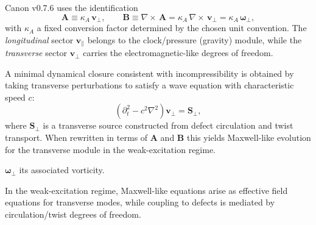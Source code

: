 \documentclass[10pt]{article}
\newcommand{\swirlarrow}{ \mathchoice{\mkern-2mu\scriptstyle\boldsymbol{\circlearrowleft}}{\mkern-2mu\scriptscriptstyle\boldsymbol{\circlearrowleft}}}
\newcommand{\vswirl}{\mathbf{v}_{\!\boldsymbol{\circlearrowleft}}}
\newcommand{\rhoF}{\rho_{\!f}}
\newcommand{\rhoE}{\rho_{\!E}}                           %
\newcommand{\rhoM}{\rho_{\!m}}     %
\newcommand{\rc}{r_c}                                    %
\newcommand{\curlop}{\nabla\times}
\begin{document}
    Canon v0.7.6 uses the identification
    \begin{equation}
        \mathbf{A} \equiv \kappa_A\,\mathbf{v}_{\perp},
        \qquad
        \mathbf{B} \equiv \curlop\,\mathbf{A}=\kappa_A\,\curlop\,\mathbf{v}_{\perp}
        =\kappa_A\,\boldsymbol{\omega}_{\perp},
        \label{eq:AB_from_vperp}
    \end{equation}
    with $\kappa_A$ a fixed conversion factor determined by the chosen unit convention.
    The \emph{longitudinal} sector $\mathbf{v}_{\parallel}$ belongs to the clock/pressure
    (gravity) module, while the \emph{transverse} sector $\mathbf{v}_{\perp}$ carries
    the electromagnetic-like degrees of freedom.

    A minimal dynamical closure consistent with incompressibility is obtained by taking
    transverse perturbations to satisfy a wave equation with characteristic speed $c$:
    \begin{equation}
        \left(\partial_t^2 - c^2 \nabla^2\right)\mathbf{v}_{\perp}= \mathbf{S}_{\perp},
        \label{eq:vperp_wave}
    \end{equation}
    where $\mathbf{S}_{\perp}$ is a transverse source constructed from defect circulation
    and twist transport. When rewritten in terms of $\mathbf{A}$ and $\mathbf{B}$ this
    yields Maxwell-like evolution for the transverse module in the weak-excitation regime.


    $\boldsymbol{\omega}_\perp$ its associated vorticity.

    In the weak-excitation regime, Maxwell-like equations arise as effective field
    equations for transverse modes, while coupling to defects is mediated by
    circulation/twist degrees of freedom.


        \providecommand{\swirlarrow}{\mathchoice{\mkern-2mu\scriptstyle\boldsymbol{\circlearrowleft}}{\mkern-2mu\scriptstyle\boldsymbol{\circlearrowleft}}{\mkern-2mu\scriptscriptstyle\boldsymbol{\circlearrowleft}}{\mkern-2mu\scriptscriptstyle\boldsymbol{\circlearrowleft}}}
        \providecommand{\vswirl}{\mathbf{v}_{\swirlarrow}}
        \providecommand{\rc}{r_c}
        \providecommand{\rhoF}{\rho_{\!f}}
        \providecommand{\rhoE}{\rho_{\!E}}
        \providecommand{\rhoM}{\rho_{\!m}}
\end{document}

